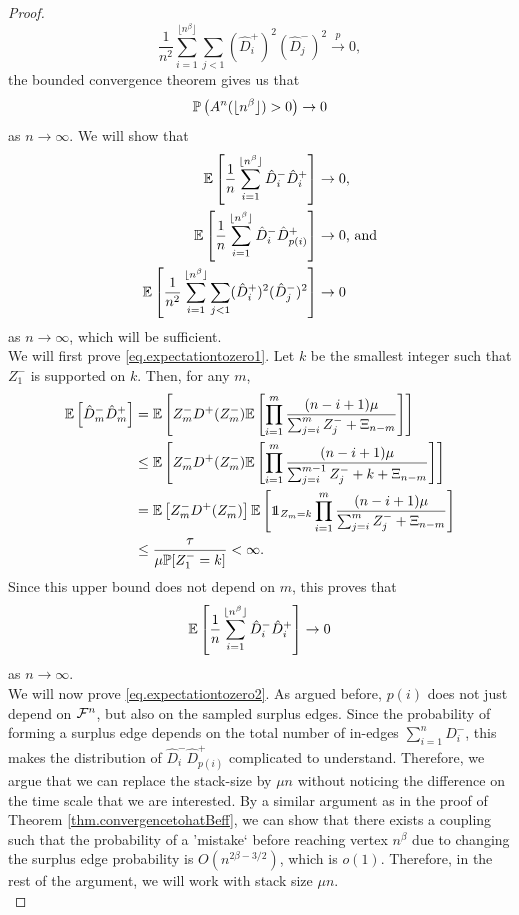 \begin{proof}
$$\frac{1}{n^2}\sum_{i=1}^{\lfloor n^\beta \rfloor}\sum_{j<1} (\hat{D}^+_i)^2 (\hat{D}^-_j)^2 \overset{p}{\to}0,$$ the bounded convergence theorem gives us that 
$$\P\left(A^n(\lfloor n^\beta \rfloor)>0\right)\to 0$$
as $n\to \infty$.
We will show that 
\begin{align}
\label{eq.expectationtozero1}\E\left[ \frac{1}{n} \sum_{i=1}^{\lfloor n^\beta \rfloor} \hat{D}^-_i\hat{D}^+_i\right]&\to 0,\\
\label{eq.expectationtozero2}\E\left[ \frac{1}{n} \sum_{i=1}^{\lfloor n^\beta \rfloor}\hat{D}^-_i\hat{D}^+_{p(i)}\right]&\to 0\text{, and}\\
\label{eq.expectationtozero3}\E\left[\frac{1}{n^2}\sum_{i=1}^{\lfloor n^\beta \rfloor}\sum_{j<1} (\hat{D}^+_i)^2 (\hat{D}^-_j)^2\right]&\to 0
\end{align}
as $n\to \infty$, which will be sufficient.\\
We will first prove \eqref{eq.expectationtozero1}. Let $k$ be the smallest integer such that $Z^-_1$ is supported on $k$. Then, for any $m$,
\begin{align*}
    \E\left[\hat{D}^-_m\hat{D}^+_m\right]&= \E\left[Z^-_m D^+(Z^-_m)\E\left[\prod\limits_{i=1}^m \frac{(n-i+1)\mu}{\sum_{j=i}^m Z^-_j + \Xi_{n-m}}\right]\right]\\
    &\leq \E\left[Z^-_m D^+(Z^-_m)\E\left[\prod\limits_{i=1}^m \frac{(n-i+1)\mu}{\sum_{j=i}^{m-1} Z^-_j +k + \Xi_{n-m}}\right]\right]\\
    &=\E\left[Z^-_m D^+(Z^-_m)\right]\E\left[\one_{Z_m=k}\prod\limits_{i=1}^m \frac{(n-i+1)\mu}{\sum_{j=i}^{m} Z^-_j + \Xi_{n-m}}\right]\\
    &\leq \frac{\tau}{\mu\P[Z^-_1=k]}<\infty.
\end{align*}
Since this upper bound does not depend on $m$, this proves that 
$$\E\left[ \frac{1}{n} \sum_{i=1}^{\lfloor n^\beta \rfloor} \hat{D}^-_i\hat{D}^+_i\right]\to 0$$
as $n\to \infty$.\\
We will now prove \eqref{eq.expectationtozero2}. As argued before, $p(i)$ does not just depend on $\cF^n$, but also on the sampled surplus edges. Since the probability of forming a surplus edge depends on the total number of in-edges $\sum_{i=1}^n D^-_i$, this makes the distribution of $\hat{D}^-_i\hat{D}^+_{p(i)}$ complicated to understand. Therefore, we argue that we can replace the stack-size by $\mu n$ without noticing the difference on the time scale that we are interested. By a similar argument as in the proof of Theorem \ref{thm.convergencetohatBeff}, we can show that there exists a coupling such that the probability of a 'mistake` before reaching vertex $n^{\beta}$ due to changing the surplus edge probability is $O(n^{2\beta-3/2})$, which is $o(1)$. Therefore, in the rest of the argument, we will work with stack size $\mu n$. \\

\end{proof}
